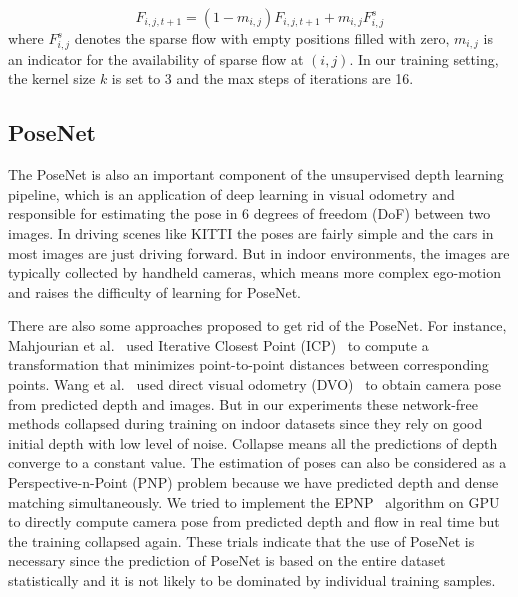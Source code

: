 \documentclass[10pt,twocolumn,letterpaper]{article}
\begin{document}
\begin{equation}
F_{i,j,t+1} = (1-m_{i,j})F_{i,j,t+1} + m_{i,j}F_{i,j}^{s}
\end{equation}
where $F_{i,j}^{s}$ denotes the sparse flow with empty positions filled with zero, $m_{i,j}$ is an indicator for the availability of sparse flow at $(i, j)$. In our training setting, the kernel size $k$ is set to 3 and the max steps of iterations are 16. 





\subsection{PoseNet}

The PoseNet is also an important component of the unsupervised depth learning pipeline, which is an application of deep learning in visual odometry and responsible for estimating the pose in 6 degrees of freedom (DoF) between two images. In driving scenes like KITTI the poses are fairly simple and the cars in most images are just driving forward. But in indoor environments, the images are typically collected by handheld cameras, which means more complex ego-motion and raises the difficulty of learning for PoseNet.

There are also some approaches proposed to get rid of the PoseNet. For instance, Mahjourian et al.~\cite{mahjourian2018unsupervised} used Iterative Closest Point (ICP)~\cite{besl1992method,chen1992object,rusinkiewicz2001efficient} to compute a transformation that minimizes point-to-point distances between corresponding points. Wang et al.~\cite{wang2018learning} used direct visual odometry (DVO)~\cite{steinbrucker2011real} to obtain camera pose from predicted depth and images. But in our experiments these network-free methods collapsed during training on indoor datasets since they rely on good initial depth with low level of noise. Collapse means all the predictions of depth converge to a constant value. The estimation of poses can also be considered as a Perspective-n-Point (PNP) problem because we have predicted depth and dense matching simultaneously. We tried to implement the EPNP~\cite{lepetit2009epnp} algorithm on GPU to directly compute camera pose from predicted depth and flow in real time but the training collapsed again. These trials indicate that the use of PoseNet is necessary since the prediction of PoseNet is based on the entire dataset statistically and it is not likely to be dominated by individual training samples.
\end{document}
